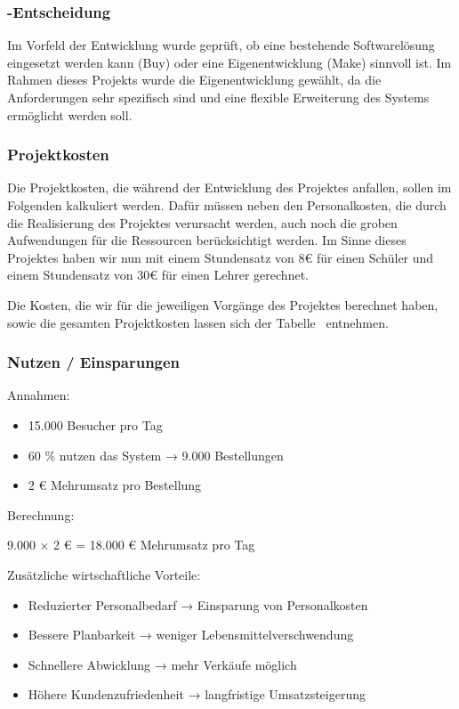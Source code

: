 \subsubsection{-Entscheidung}
\label{sec:MakeOrBuyEntscheidung}
Im Vorfeld der Entwicklung wurde geprüft, ob eine bestehende Softwarelösung eingesetzt werden kann (Buy) oder eine Eigenentwicklung (Make) sinnvoll ist.
Im Rahmen dieses Projekts wurde die Eigenentwicklung gewählt, da die Anforderungen sehr spezifisch sind und eine flexible Erweiterung des Systems ermöglicht werden soll.

\subsubsection{Projektkosten}
\label{sec:Projektkosten}
Die Projektkosten, die während der Entwicklung des Projektes anfallen, sollen im Folgenden kalkuliert werden. Dafür müssen neben den Personalkosten, die durch die Realisierung 
des Projektes verursacht werden, auch noch die groben Aufwendungen für die Ressourcen berücksichtigt werden. Im Sinne dieses Projektes haben wir nun mit einem Stundensatz von
8€ für einen Schüler und einem Stundensatz von 30€ für einen Lehrer gerechnet.

Die Kosten, die wir für die jeweiligen Vorgänge des Projektes berechnet haben, sowie die gesamten Projektkosten lassen sich der Tabelle~ entnehmen.

\subsubsection{Nutzen / Einsparungen}
\label{sec:Nutzen_Einsparungen}
Annahmen:
\begin{itemize}
    \item 15.000 Besucher pro Tag
    \item 60 \% nutzen das System → 9.000 Bestellungen
    \item 2 € Mehrumsatz pro Bestellung
\end{itemize}

Berechnung:

9.000 × 2 € = 18.000 € Mehrumsatz pro Tag

Zusätzliche wirtschaftliche Vorteile:
\begin{itemize}
    \item Reduzierter Personalbedarf → Einsparung von Personalkosten
    \item Bessere Planbarkeit → weniger Lebensmittelverschwendung
    \item Schnellere Abwicklung → mehr Verkäufe möglich
    \item Höhere Kundenzufriedenheit → langfristige Umsatzsteigerung
\end{itemize}

